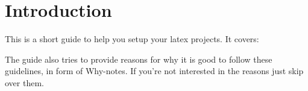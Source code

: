 \section{Introduction}\label{sec:introduction}
This is a short guide to help you setup your latex projects. It covers:

\tableofcontents
 
The guide also tries to provide reasons for why it is good to follow these guidelines, in form of Why-notes. If you're not interested in the reasons just skip over them.